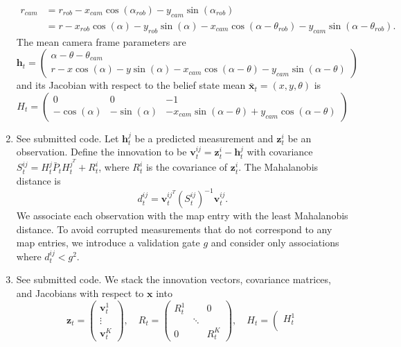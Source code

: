 \documentclass[12pt]{article}
\begin{document}
\begin{enumerate}
\begin{align*}
		r_{cam} &= r_{rob} - x_{cam}\cos(\alpha_{rob}) - y_{cam}\sin(\alpha_{rob}) \\
		&= r - x_{rob}\cos(\alpha) - y_{rob}\sin(\alpha) - x_{cam}\cos(\alpha - \theta_{rob}) - y_{cam}\sin(\alpha - \theta_{rob}).
	\end{align*}
	The mean camera frame parameters are
	\[
		\mathbf{h}_t = \left(\begin{array}{c}
			\alpha - \theta - \theta_{cam} \\
			r - x\cos(\alpha) - y\sin(\alpha) - x_{cam}\cos(\alpha - \theta) - y_{cam}\sin(\alpha - \theta)
		\end{array}\right)
	\]
	and its Jacobian with respect to the belief state mean $\bar{\mathbf{x}}_t = (x,y,\theta)$ is
	\[
		H_t = \left(\begin{array}{ccc}
			0 & 0 & -1 \\
			-\cos(\alpha) & -\sin(\alpha) & -x_{cam}\sin(\alpha - \theta) + y_{cam}\cos(\alpha - \theta)
		\end{array}\right)
	\]
	\item See submitted code. Let $\mathbf{h}_t^j$ be a predicted measurement and $\mathbf{z}_t^i$ be an observation. Define the innovation to be $\mathbf{v}_t^{ij} = \mathbf{z}_t^i - \mathbf{h}_t^j$ with covariance $S_t^{ij} = H_t^j \bar P_t H_t^{j^T} + R_t^i$, where $R_t^i$ is the covariance of $\mathbf{z}_t^i$. The Mahalanobis distance is
	\[
		d_t^{ij} = \mathbf{v}_t^{ij^T} (S_t^{ij})^{-1} \mathbf{v}_t^{ij}.
	\]
	We associate each observation with the map entry with the least Mahalanobis distance. To avoid corrupted measurements that do not correspond to any map entries, we introduce a validation gate $g$ and consider only associations where $d_t^{ij} < g^2$.
	\item See submitted code. We stack the innovation vectors, covariance matrices, and Jacobians with respect to $\mathbf{x}$ into
	\[
		\mathbf{z}_t = \left(\begin{array}{c}
			\mathbf{v}_t^1 \\
			\vdots \\
			\mathbf{v}_t^K
		\end{array}\right), \quad
		R_t = \left(\begin{array}{ccc}
			R_t^1 & & 0 \\
			 & \ddots & \\
			0 & & R_t^K
		\end{array}\right), \quad
		H_t = \left(\begin{array}{c}
			H_t^1 \\

\end{array}\]
\end{enumerate}
\end{document}
